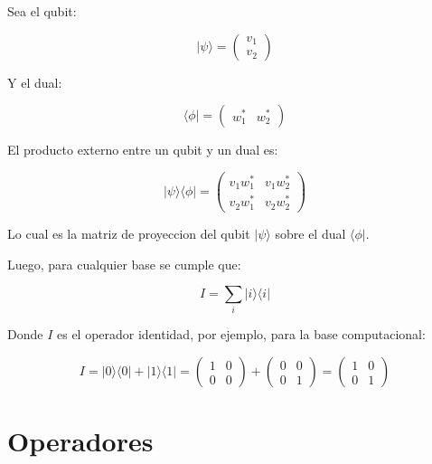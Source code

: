 \documentclass[11pt]{article}
\begin{document}
Sea el qubit:

\begin{equation}
    |\psi\rangle = \begin{pmatrix} v_1 \\ v_2 \end{pmatrix}
\end{equation}

Y el dual:

\begin{equation}
    \langle \phi | = \begin{pmatrix} w_1^* & w_2^* \end{pmatrix}
\end{equation}

El producto externo entre un qubit y un dual es:

\begin{equation}
    |\psi\rangle \langle \phi | = \begin{pmatrix} v_1 w_1^* & v_1 w_2^* \\ v_2 w_1^* & v_2 w_2^* \end{pmatrix}
\end{equation}

Lo cual es la matriz de proyeccion del qubit $|\psi\rangle$ sobre el dual $\langle \phi |$.

Luego, para cualquier base se cumple que:

\begin{equation}
    I = \sum_{i} |i\rangle \langle i |
\end{equation}

Donde $I$ es el operador identidad, por ejemplo, para la base computacional:

\begin{equation}
    I = |0\rangle \langle 0| + |1\rangle \langle 1| = \begin{pmatrix} 1 & 0 \\ 0 & 0 \end{pmatrix} + \begin{pmatrix} 0 & 0 \\ 0 & 1 \end{pmatrix} = \begin{pmatrix} 1 & 0 \\ 0 & 1 \end{pmatrix}
\end{equation}

\section{Operadores}
\end{document}
